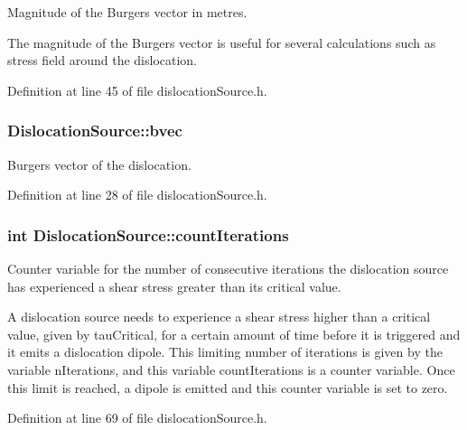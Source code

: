Magnitude of the Burgers vector in metres. 

The magnitude of the Burgers vector is useful for several calculations such as stress field around the dislocation. 

Definition at line 45 of file dislocation\-Source.\-h.

\hypertarget{classDislocationSource_ade4753ac6106317c693c2bba4f83a568}{
\subsubsection[{bvec}]{ Dislocation\-Source\-::bvec\hspace{0.3cm}{\ttfamily [protected]}}}\label{de/de3/classDislocationSource_ade4753ac6106317c693c2bba4f83a568}


Burgers vector of the dislocation. 



Definition at line 28 of file dislocation\-Source.\-h.

\hypertarget{classDislocationSource_ac566b877a7c43922077af29bba597a93}{
\subsubsection[{count\-Iterations}]{\setlength{\rightskip}{0pt plus 5cm}int Dislocation\-Source\-::count\-Iterations\hspace{0.3cm}{\ttfamily [protected]}}}\label{de/de3/classDislocationSource_ac566b877a7c43922077af29bba597a93}


Counter variable for the number of consecutive iterations the dislocation source has experienced a shear stress greater than its critical value. 

A dislocation source needs to experience a shear stress higher than a critical value, given by tau\-Critical, for a certain amount of time before it is triggered and it emits a dislocation dipole. This limiting number of iterations is given by the variable n\-Iterations, and this variable count\-Iterations is a counter variable. Once this limit is reached, a dipole is emitted and this counter variable is set to zero. 

Definition at line 69 of file dislocation\-Source.\-h.

